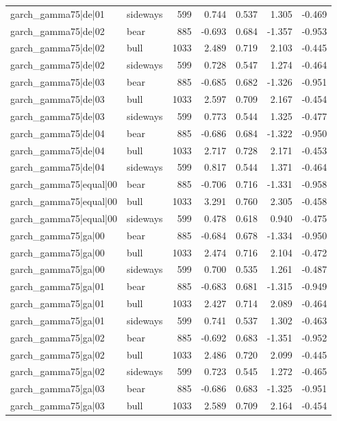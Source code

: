 \begin{table}
\begin{tabular}{llrrrrr}
garch\_gamma75|de|01 & sideways & 599 & 0.744 & 0.537 & 1.305 & -0.469 \\
garch\_gamma75|de|02 & bear & 885 & -0.693 & 0.684 & -1.357 & -0.953 \\
garch\_gamma75|de|02 & bull & 1033 & 2.489 & 0.719 & 2.103 & -0.445 \\
garch\_gamma75|de|02 & sideways & 599 & 0.728 & 0.547 & 1.274 & -0.464 \\
garch\_gamma75|de|03 & bear & 885 & -0.685 & 0.682 & -1.326 & -0.951 \\
garch\_gamma75|de|03 & bull & 1033 & 2.597 & 0.709 & 2.167 & -0.454 \\
garch\_gamma75|de|03 & sideways & 599 & 0.773 & 0.544 & 1.325 & -0.477 \\
garch\_gamma75|de|04 & bear & 885 & -0.686 & 0.684 & -1.322 & -0.950 \\
garch\_gamma75|de|04 & bull & 1033 & 2.717 & 0.728 & 2.171 & -0.453 \\
garch\_gamma75|de|04 & sideways & 599 & 0.817 & 0.544 & 1.371 & -0.464 \\
garch\_gamma75|equal|00 & bear & 885 & -0.706 & 0.716 & -1.331 & -0.958 \\
garch\_gamma75|equal|00 & bull & 1033 & 3.291 & 0.760 & 2.305 & -0.458 \\
garch\_gamma75|equal|00 & sideways & 599 & 0.478 & 0.618 & 0.940 & -0.475 \\
garch\_gamma75|ga|00 & bear & 885 & -0.684 & 0.678 & -1.334 & -0.950 \\
garch\_gamma75|ga|00 & bull & 1033 & 2.474 & 0.716 & 2.104 & -0.472 \\
garch\_gamma75|ga|00 & sideways & 599 & 0.700 & 0.535 & 1.261 & -0.487 \\
garch\_gamma75|ga|01 & bear & 885 & -0.683 & 0.681 & -1.315 & -0.949 \\
garch\_gamma75|ga|01 & bull & 1033 & 2.427 & 0.714 & 2.089 & -0.464 \\
garch\_gamma75|ga|01 & sideways & 599 & 0.741 & 0.537 & 1.302 & -0.463 \\
garch\_gamma75|ga|02 & bear & 885 & -0.692 & 0.683 & -1.351 & -0.952 \\
garch\_gamma75|ga|02 & bull & 1033 & 2.486 & 0.720 & 2.099 & -0.445 \\
garch\_gamma75|ga|02 & sideways & 599 & 0.723 & 0.545 & 1.272 & -0.465 \\
garch\_gamma75|ga|03 & bear & 885 & -0.686 & 0.683 & -1.325 & -0.951 \\
garch\_gamma75|ga|03 & bull & 1033 & 2.589 & 0.709 & 2.164 & -0.454 \\

\end{tabular}
\end{table}

